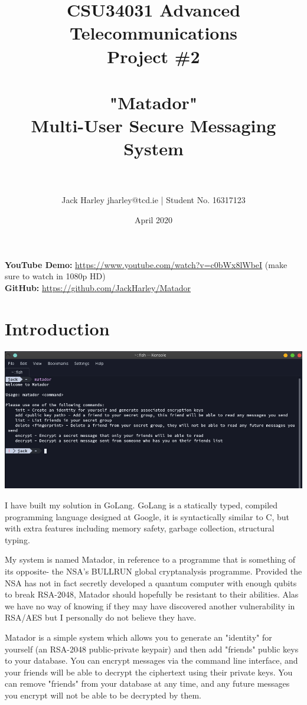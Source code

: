 \documentclass{article}[12pt]
\title{CSU34031 Advanced Telecommunications\\Project \#2\\~\\"Matador"\\Multi-User Secure Messaging System\\~}
\author{Jack Harley jharley@tcd.ie | Student No. 16317123}
\date{April 2020}
\begin{document}
	\maketitle
	
	\textbf{YouTube Demo:} \url{https://www.youtube.com/watch?v=c0bWx8lWbeI} (make sure to watch in 1080p HD)\\
	\textbf{GitHub:} \url{https://github.com/JackHarley/Matador}
	
	\tableofcontents
	
	\newpage
	
	\setlength{\parskip}{1em}
		
	\section{Introduction}
	
		\includegraphics[width=18cm]{intro.png}
		
		I have built my solution in GoLang. GoLang is a statically typed, compiled programming language designed at Google, it is syntactically similar to C, but with extra features including memory safety, garbage collection, structural typing.
		
		My system is named Matador, in reference to a programme that is something of its opposite- the NSA's BULLRUN global cryptanalysis programme. Provided the NSA has not in fact secretly developed a quantum computer with enough qubits to break RSA-2048, Matador should hopefully be resistant to their abilities. Alas we have no way of knowing if they may have discovered another vulnerability in RSA/AES but I personally do not believe they have.
		
		Matador is a simple system which allows you to generate an "identity" for yourself (an RSA-2048 public-private keypair) and then add "friends" public keys to your database. You can encrypt messages via the command line interface, and your friends will be able to decrypt the ciphertext using their private keys. You can remove "friends" from your database at any time, and any future messages you encrypt will not be able to be decrypted by them.
		
\end{document}
